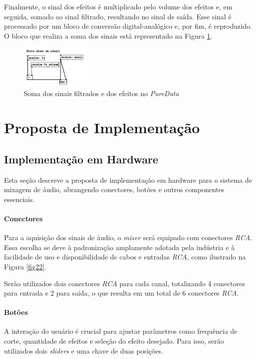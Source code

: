 Finalmente, o sinal dos efeitos é multiplicado pelo volume dos efeitos e, em seguida, somado ao sinal filtrado, resultando no sinal de saída. Esse sinal é processado por um bloco de conversão digital-analógico e, por fim, é reproduzido. O bloco que realiza a soma dos sinais está representado na Figura \ref{fig51}.

\begin{figure}[h]
    \centering
    \includegraphics[width=0.3\textwidth]{figuras/fig51.png}
    \caption{Soma dos sinais filtrados e dos efeitos no \textit{PureData}}
    \label{fig51}
\end{figure}


\section{Proposta de Implementação}

\subsection{Implementação em Hardware}

Esta seção descreve a proposta de implementação em hardware para o sistema de mixagem de áudio, abrangendo conectores, botões e outros componentes essenciais.

\paragraph{Conectores}
Para a aquisição dos sinais de áudio, o \textit{mixer} será equipado com conectores \textit{RCA}. Essa escolha se deve à padronização amplamente adotada pela indústria e à facilidade de uso e disponibilidade de cabos e entradas \textit{RCA}, como ilustrado na Figura \ref{fig22}.

Serão utilizados dois conectores \textit{RCA} para cada canal, totalizando 4 conectores para entrada e 2 para saída, o que resulta em um total de 6 conectores \textit{RCA}.

\paragraph{Botões}
A interação do usuário é crucial para ajustar parâmetros como frequência de corte, quantidade de efeitos e seleção do efeito desejado. Para isso, serão utilizados dois \textit{sliders} e uma chave de duas posições.


